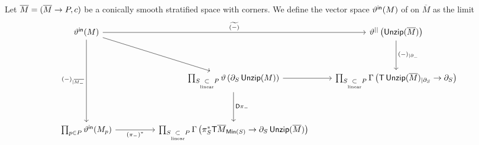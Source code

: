\begin{definition}\cite[Definition~8.1.2]{AFT1}
    Let $\overline{M} = (\overline{M}\rightarrow P,c)$ be a conically smooth stratified space with corners. We define the vector space $\vartheta^{\sf in}(M)$ of  on $\overline{M}$ as the limit 
    \begin{equation}
        \begin{tikzcd}[ampersand replacement=\&]
            {\vartheta^{\sf in}(M)} \&\&\& {\vartheta^{||}\left(\unzip(\overline{M})\right)} \\
            \\
            \&\& {\prod_{S\underset{\text{linear}}{\subset}P}\vartheta\left(\partial_{S}\unzip(M)\right)} \& {\prod_{S\underset{\text{linear}}{\subset}P}\Gamma\left(\sT \unzip(\overline{M})_{|\partial_S}\ra \partial_S \right)} \\
            \\
            {\prod_{p\in P} \vartheta^{\sf in}(M_p)} \&\& {\prod_{S\underset{\text{linear}}{\subset}P} \Gamma\left(\pi_{S}^*\sT \overline{M}_{\mathsf{Min}(S)}\ra \partial_{S}\unzip(\overline{M})\right)}
            \arrow["{\widetilde{(-)}}", from=1-1, to=1-4]
            \arrow[from=1-1, to=3-3]
            \arrow["{(-)_{|\overline{M_{-}}}}"', from=1-1, to=5-1]
            \arrow["{(-)_{|\partial_{-}}}", from=1-4, to=3-4]
            \arrow[from=3-3, to=3-4]
            \arrow["{\sD\pi_{-}}", from=3-3, to=5-3]
            \arrow["{(\pi_{-})^{*}}"', from=5-1, to=5-3]
        \end{tikzcd}
    \end{equation}
\end{definition}


